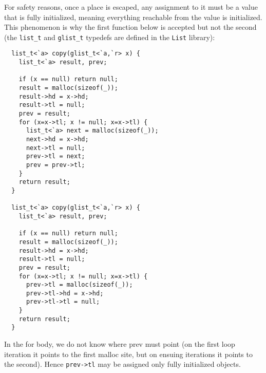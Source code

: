 For safety reasons, once a place is escaped, any assignment to it must
be a value that is fully initialized, meaning everything reachable
from the value is initialized. This phenomenon is why the first
function below is accepted but not the second (the \texttt{list_t} and
\texttt{glist_t} typedefs are defined in the \texttt{List} library):
\begin{verbatim}
  list_t<`a> copy(glist_t<`a,`r> x) {
    list_t<`a> result, prev;

    if (x == null) return null;
    result = malloc(sizeof(_));
    result->hd = x->hd;
    result->tl = null;
    prev = result;
    for (x=x->tl; x != null; x=x->tl) {
      list_t<`a> next = malloc(sizeof(_));
      next->hd = x->hd;
      next->tl = null;
      prev->tl = next;
      prev = prev->tl;
    }
    return result;
  } 

  list_t<`a> copy(glist_t<`a,`r> x) {
    list_t<`a> result, prev;

    if (x == null) return null;
    result = malloc(sizeof(_));
    result->hd = x->hd;
    result->tl = null;
    prev = result;
    for (x=x->tl; x != null; x=x->tl) {
      prev->tl = malloc(sizeof(_));
      prev->tl->hd = x->hd;
      prev->tl->tl = null;
    }
    return result;
  } 
\end{verbatim}

In the for body, we do not know where prev must point (on the first
loop iteration it points to the first malloc site, but on ensuing
iterations it points to the second).  Hence \texttt{prev->tl} may be
assigned only fully initialized objects.


